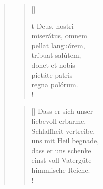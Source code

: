 \begin{quote}

\begin{multicols}{2}
\begin{verse}[\versewidth]

{\normalsize{t Deus, nostri\\
miserátus, omnem\\
pellat languórem,\\
tríbuat salútem, \\
donet et nobis\\
pietáte patris\\
regna polórum.\\!}}

\end{verse}

\columnbreak

\begin{verse}[\versewidth]
{\normalsize\rm{ Dass er sich unser\\
liebevoll erbarme,\\
Schlaffheit vertreibe,\\
uns mit Heil begnade,\\
dass er uns schenke\\
einst voll Vatergüte\\
himmlische Reiche.\\!}}
\end{verse}

\end{multicols}
\end{quote}

\newpage

